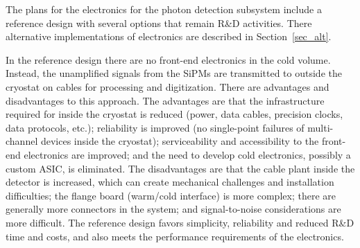 %
The plans for the electronics for the photon detection subsystem
include a reference design with several options that remain R\&D
activities.  There alternative implementations of electronics are
described in Section~\ref{sec_alt}.

In the reference design there are no front-end electronics in the cold
volume.  Instead, the unamplified signals from the SiPMs are
transmitted to outside the cryostat on cables for processing and
digitization. There are advantages and disadvantages to this approach.
The advantages are that the infrastructure required for inside the
cryostat is reduced (power, data cables, precision clocks, data
protocols, etc.); reliability is improved (no single-point failures of
multi-channel devices inside the cryostat); serviceability and
accessibility to the front-end electronics are improved; and the need
to develop cold electronics, possibly a custom ASIC, is eliminated.
The disadvantages are that the cable plant inside the detector is
increased, which can create mechanical challenges and installation
difficulties; the flange board (warm/cold interface) is more complex;
there are generally more connectors in the system; and signal-to-noise
considerations are more difficult.  The reference design favors
simplicity, reliability and reduced R\&D time and costs, and also
meets the performance requirements of the electronics.

